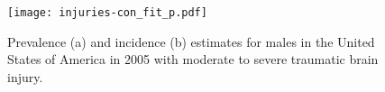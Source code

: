     \begin{figure}[h]
        \begin{center}
            \texttt{[image: injuries-con\_fit\_p.pdf]}
            \caption{Prevalence (a) and incidence (b)
              estimates for males in the United States of America in
              2005 with moderate to severe traumatic brain injury.}
            \label{fig:app-injury brain fit}
        \end{center}
    \end{figure}



